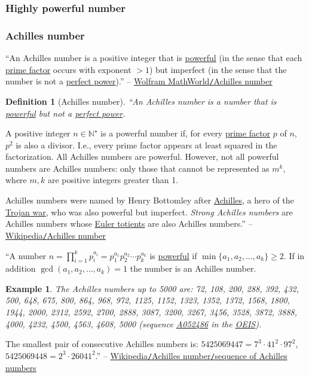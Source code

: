 \documentclass{article}
\newtheorem{definition}{Definition}
\newtheorem{example}{Example}
\begin{document}
\subsubsection{Highly powerful number}

\subsubsection{Achilles number}
``An Achilles number is a positive integer that is \href{https://mathworld.wolfram.com/PowerfulNumber.html}{powerful} (in the sense that each \href{https://mathworld.wolfram.com/PrimeFactor.html}{prime factor} occurs with exponent $> 1$) but imperfect (in the sense that the number is not a \href{https://mathworld.wolfram.com/PerfectPower.html}{perfect power}).'' -- \href{https://mathworld.wolfram.com/AchillesNumber.html}{Wolfram MathWorld{\tt/}Achilles number}

\begin{definition}[Achilles number]
	``An \emph{Achilles number} is a number that is \href{https://en.wikipedia.org/wiki/Powerful_number}{powerful} but not a \href{https://en.wikipedia.org/wiki/Perfect_power}{perfect power}.
\end{definition}
A positive integer $n\in\mathbb{N}^\star$ is a powerful number if, for every \href{https://en.wikipedia.org/wiki/Prime_factor}{prime factor} $p$ of $n$, $p^2$ is also a divisor. I.e., every prime factor appears at least squared in the factorization. All Achilles numbers are powerful. However, not all powerful numbers are Achilles numbers: only those that cannot be represented as $m^k$, where $m,k$ are positive integers greater than 1.

Achilles numbers were named by Henry Bottomley after \href{https://en.wikipedia.org/wiki/Achilles}{Achilles}, a hero of the \href{https://en.wikipedia.org/wiki/Trojan_war}{Trojan war}, who was also powerful but imperfect. \textit{Strong Achilles numbers} are Achilles numbers whose \href{https://en.wikipedia.org/wiki/Euler_totient}{Euler totients} are also Achilles numbers.'' -- \href{https://en.wikipedia.org/wiki/Achilles_number}{Wikipedia{\tt/}Achilles number}

``A number $n = \prod_{i=1}^k p_i^{a_i} = p_1^{a_1}p_2^{a_2}\cdots p_k^{a_k}$ is \href{https://en.wikipedia.org/wiki/Powerful_number}{powerful} if $\min\{a_1,a_2,\ldots,a_k\}\ge2$. If in addition $\operatorname{gcd}(a_1,a_2,\ldots,a_k) = 1$ the number is an Achilles number.

\begin{example}
	The Achilles numbers up to 5000 are: \emph{72, 108, 200, 288, 392, 432, 500, 648, 675, 800, 864, 968, 972, 1125, 1152, 1323, 1352, 1372, 1568, 1800, 1944, 2000, 2312, 2592, 2700, 2888, 3087, 3200, 3267, 3456, 3528, 3872, 3888, 4000, 4232, 4500, 4563, 4608, 5000} (sequence \href{https://oeis.org/A052486}{A052486} in the \href{https://en.wikipedia.org/wiki/On-Line_Encyclopedia_of_Integer_Sequences}{OEIS}).
\end{example}
The smallest pair of consecutive Achilles numbers is: $5425069447 = 7^3\cdot41^2\cdot97^2$, $5425069448 = 2^3\cdot26041^2$.'' -- \href{https://en.wikipedia.org/wiki/Achilles_number#Sequence_of_Achilles_numbers}{Wikipedia{\tt/}Achilles number{\tt/}sequence of Achilles numbers}
\end{document}
